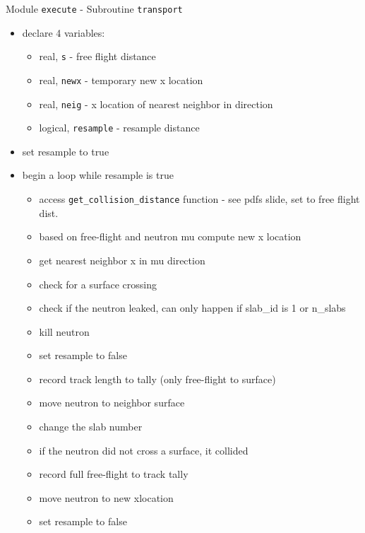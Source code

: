 \documentclass{beamer}
\begin{document}
\begin{frame}[allowframebreaks]{Module \texttt{execute} - Subroutine \texttt{transport}}

  \begin{itemize}
    \item declare 4 variables:
    \begin{itemize}
      \item real, \texttt{s} - free flight distance
      \item real, \texttt{newx} - temporary new x location
      \item real, \texttt{neig} - x location of nearest neighbor in direction
      \item logical, \texttt{resample} - resample distance
    \end{itemize}
    \vfill\item set resample to true
    \vfill\item begin a loop while resample is true
    \begin{itemize}
      \vfill\item access \texttt{get\_collision\_distance} function - see pdfs slide, set to free flight dist.
      \vfill\item based on free-flight and neutron mu compute new x location
      \vfill\item get nearest neighbor x in mu direction
      \vfill\item check for a surface crossing
	\vfill\item check if the neutron leaked, \alert{can only happen if slab\_id is 1 or n\_slabs}
	  \vfill\item kill neutron
	  \vfill\item set resample to false
	\vfill\item record track length to tally (only free-flight to surface)
	\vfill\item move neutron to neighbor surface
	\vfill\item change the slab number
      \vfill\item if the neutron did not cross a surface, it collided
      \vfill\item record full free-flight to track tally
      \vfill\item move neutron to new xlocation
      \vfill\item set resample to false

    \end{itemize}


\end{itemize}
\end{frame}
\end{document}
